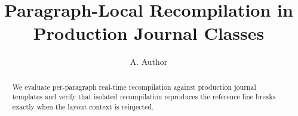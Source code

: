 \title{Paragraph-Local Recompilation in Production Journal Classes}
\author{A. Author}
\begin{abstract}
We evaluate per-paragraph real-time recompilation against production
journal templates and verify that isolated recompilation reproduces the
reference line breaks exactly when the layout context is reinjected.
\end{abstract}
\maketitle
